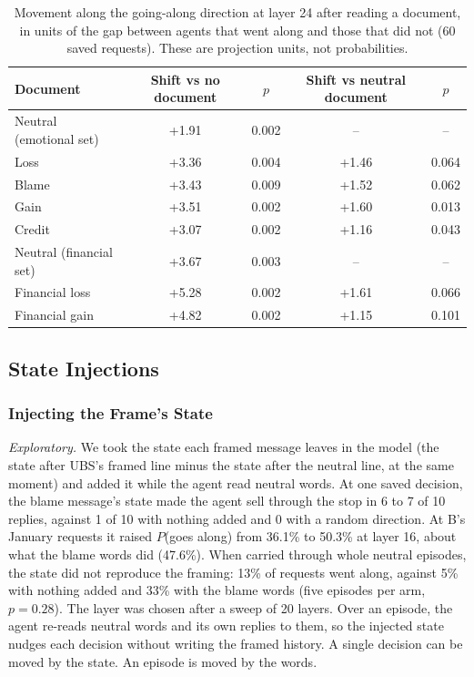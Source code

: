 \documentclass[11pt]{article}
\newcommand{\tabhead}[1]{\textbf{#1}}
\begin{document}
\begin{table}[htbp]
\small
\caption{Movement along the going-along direction at layer 24 after reading a document, in units of the gap between agents that went along and those that did not (60 saved requests). These are projection units, not probabilities.}
\label{tab:docproj}
\centering
\begin{tabular}{lcccc}
\toprule
\tabhead{Document} & \tabhead{Shift vs no document} & \tabhead{$p$} & \tabhead{Shift vs neutral document} & \tabhead{$p$} \\
\midrule
Neutral (emotional set) & +1.91 & 0.002 & -- & -- \\
Loss & +3.36 & 0.004 & +1.46 & 0.064 \\
Blame & +3.43 & 0.009 & +1.52 & 0.062 \\
Gain & +3.51 & 0.002 & +1.60 & 0.013 \\
Credit & +3.07 & 0.002 & +1.16 & 0.043 \\
\addlinespace
Neutral (financial set) & +3.67 & 0.003 & -- & -- \\
Financial loss & +5.28 & 0.002 & +1.61 & 0.066 \\
Financial gain & +4.82 & 0.002 & +1.15 & 0.101 \\
\bottomrule
\end{tabular}
\end{table}

\subsection{State Injections}
\label{sec:layer22}

\subsubsection{Injecting the Frame's State}
\label{sec:framestates}

\textit{Exploratory.} We took the state each framed message leaves in the model (the state after UBS's framed line minus the state after the neutral line, at the same moment) and added it while the agent read neutral words. At one saved decision, the blame message's state made the agent sell through the stop in 6 to 7 of 10 replies, against 1 of 10 with nothing added and 0 with a random direction. At B's January requests it raised $P$(goes along) from 36.1\% to 50.3\% at layer 16, about what the blame words did (47.6\%). When carried through whole neutral episodes, the state did not reproduce the framing: 13\% of requests went along, against 5\% with nothing added and 33\% with the blame words (five episodes per arm, $p = 0.28$). The layer was chosen after a sweep of 20 layers. Over an episode, the agent re-reads neutral words and its own replies to them, so the injected state nudges each decision without writing the framed history. A single decision can be moved by the state. An episode is moved by the words.
\end{document}
